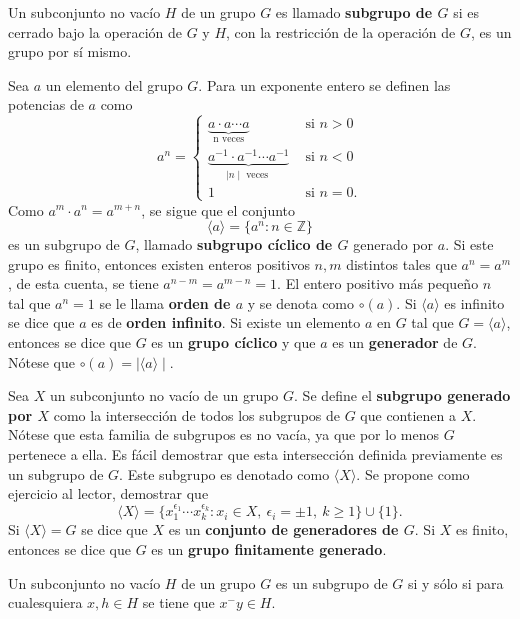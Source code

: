 \begin{definicion}
Un subconjunto no vacío $H$ de un grupo $G$ es llamado \textbf{subgrupo de $G$} si es cerrado bajo la operación de $G$ y $H$, con la restricción de la operación de $G$, es un grupo por sí mismo.
\end{definicion}
\begin{ejemplo}
Sea $a$ un elemento del grupo $G$. Para un exponente entero se definen las potencias de $a$ como
\[ a^n = \left\{ \begin{array}{lr}
\underset{\mbox{n veces}}{\underbrace{a \cdot a \cdots a}} & \mbox{ si } n >0\\
\underset{\mid n \mid \mbox{ veces }}{\underbrace{a^{-1}\cdot a^{-1}\cdots a^{-1}}} & \mbox{ si } n<0 \\
1 & \mbox{ si } n = 0.
\end{array} \right.  \]
Como $a^m \cdot a^n = a^{m+n}$, se sigue que el conjunto
\[\langle a \rangle = \{ a^n : n \in \mathds{Z} \} \]
es un subgrupo de $G$, llamado \textbf{subgrupo cíclico de $G$} generado por $a$.
Si este grupo es finito, entonces existen enteros positivos $n,m$ distintos tales que $a^n = a^m$, de esta cuenta, se tiene $a^{n-m} = a^{m-n} = 1$. El entero positivo más pequeño $n$  tal que $a^n = 1$ se le llama \textbf{orden de $a$} y se denota como $\circ(a)$. Si $\langle a \rangle$ es infinito se dice que $a$ es de \textbf{orden infinito}.
Si existe un elemento $a$ en $G$ tal que $G = \langle a \rangle$, entonces se dice que $G$ es un \textbf{grupo cíclico} y que $a$ es un \textbf{generador} de $G$. Nótese que $\circ(a) = \mid \langle a \rangle \mid $.
\end{ejemplo}
\begin{ejemplo}
Sea $X$ un subconjunto no vacío de un grupo $G$. Se define el \textbf{subgrupo generado por $X$} como la intersección de todos los subgrupos de $G$ que contienen a $X$. Nótese que esta familia de subgrupos es no vacía, ya que por lo menos $G$ pertenece a ella. Es fácil demostrar que esta intersección definida previamente es un subgrupo de $G$. Este subgrupo es denotado como $\langle X \rangle$. Se propone como ejercicio al lector, demostrar que 
\[ \langle X \rangle = \{ x_1^{\epsilon_1} \cdots x_k^{\epsilon_k} \colon x_i \in X, \ \epsilon_i = \pm 1, \ k \geq 1 \} \cup \{1\} .\]
Si $\langle X \rangle = G$ se dice que $X$ es un \textbf{conjunto de generadores de $G$}. Si $X$ es finito, entonces se dice que $G$ es un \textbf{grupo finitamente generado}.
\end{ejemplo}
 \begin{lema}
 Un subconjunto no vacío $H$ de un grupo $G$ es un subgrupo de $G$ si y sólo si para cualesquiera $x,h \in H$ se tiene que $x^-y \in H$.
 \end{lema}
